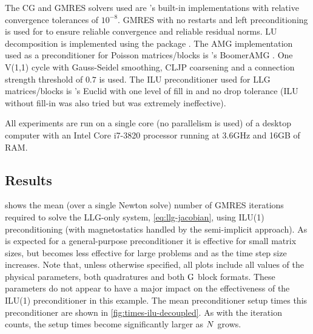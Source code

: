 The CG and GMRES solvers used are \oomph's built-in implementations with relative convergence tolerances of $10^{-8}$.
GMRES with no restarts and left preconditioning is used for to ensure reliable convergence and reliable residual norms.
LU decomposition is implemented using the \superlu package \cite{superlu}.
The AMG implementation used as a preconditioner for Poisson matrices/blocks is \hypre's BoomerAMG \cite{hypre}.
One V(1,1) cycle with Gauss-Seidel smoothing, CLJP coarsening and a connection strength threshold of $0.7$ is used.
The ILU preconditioner used for LLG matrices/blocks is \hypre's Euclid with one level of fill in and no drop tolerance (ILU without fill-in was also tried but was extremely ineffective).


All experiments are run on a single core (\ie no parallelism is used) of a desktop computer with an Intel Core i7-3820 processor running at 3.6GHz and 16GB of RAM.


\subsection{Results}



 shows the mean (over a single Newton solve) number of GMRES iterations required to solve the LLG-only system, \cref{eq:llg-jacobian}, using ILU(1) preconditioning (\ie with magnetostatics handled by the semi-implicit approach).
As is expected for a general-purpose preconditioner it is effective for small matrix sizes, but becomes less effective for large problems and as the time step size increases.
Note that, unless otherwise specified, all plots include all values of the physical parameters, both quadratures and both $\mathrm{G}$ block formats.
These parameters do not appear to have a major impact on the effectiveness of the ILU(1) preconditioner in this example.
The mean preconditioner setup times this preconditioner are shown in \cref{fig:times-ilu-decoupled}.
As with the iteration counts, the setup times become significantly larger as $N$ grows.

